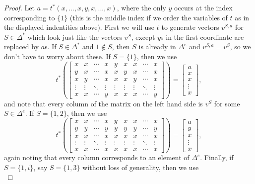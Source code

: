\documentclass[letterpaper,11pt]{article}
\begin{document}
\begin{proof}
Let $a = t^*(x,...,x,y,x,...,x)$, where the only $y$ occurs at the index corresponding to $\{1\}$ (this is the middle index if we order the variables of $t$ as in the displayed indentities above). First we will use $t$ to generate vectors $v^{S,a}$ for $S \in \Delta^*$ which look just like the vectors $v^S$, except $y$s in the first coordinate are replaced by $a$s. If $S \in \Delta^*$ and $1 \not\in S$, then $S$ is already in $\Delta^e$ and $v^{S,a} = v^S$, so we don't have to worry about these. If $S = \{1\}$, then we use
\[
t^*\left(\begin{bmatrix} x & x & \cdots & x & y & x & x & \cdots & x\\ y & x & \cdots & x & x & y & x & \cdots & x\\ x & y & \cdots & x & x & x & y & \cdots & x\\ \vdots & \vdots & \ddots & \vdots & \vdots & \vdots & \vdots & \ddots & \vdots \\ x & x & \cdots & y & x & x & x & \cdots & y \end{bmatrix}\right) = \begin{bmatrix}a\\ x\\ x\\ \vdots \\ x\end{bmatrix},
\]
and note that every column of the matrix on the left hand side is $v^S$ for some $S \in \Delta^e$. If $S = \{1,2\}$, then we use
\[
t^*\left(\begin{bmatrix} x & x & \cdots & x & y & x & x & \cdots & x\\ y & y & \cdots & y & y & y & y & \cdots & y\\ x & x & \cdots & x & x & x & x & \cdots & x\\ \vdots & \vdots & \ddots & \vdots & \vdots & \vdots & \vdots & \ddots & \vdots \\ x & x & \cdots & x & x & x & x & \cdots & x \end{bmatrix}\right) = \begin{bmatrix}a\\ y\\ x\\ \vdots \\ x\end{bmatrix},
\]
again noting that every column corresponds to an element of $\Delta^e$. Finally, if $S = \{1,i\}$, say $S = \{1,3\}$ without loss of generality, then we use
\[
\]
\end{proof}
\end{document}
